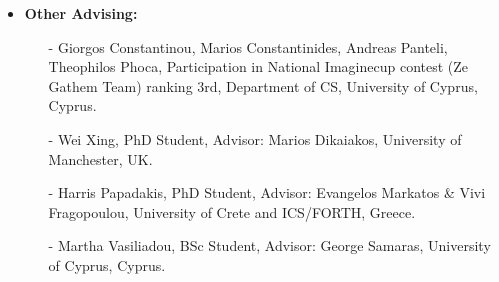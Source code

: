 \documentclass[10pt]{article}
\begin{document}
\begin{itemize}
   \item {\bf Other Advising: }
	\begin{itemize}
		\setlength{\itemsep}{0.10ex}
			\item[-] Giorgos Constantinou, Marios Constantinides, Andreas Panteli, Theophilos Phoca, Participation in National Imaginecup contest (Ze Gathem Team) ranking 3rd, Department of CS, University of Cyprus, Cyprus.
			\item[-] Wei Xing, PhD Student, Advisor: Marios Dikaiakos, University of Manchester, UK.
			\item[-] Harris Papadakis, PhD Student, Advisor: Evangelos Markatos \& Vivi Fragopoulou, University of Crete and ICS/FORTH, Greece.
			\item[-] Martha Vasiliadou, BSc Student, Advisor: George Samaras, University of Cyprus, Cyprus.
	\end{itemize}   		
\end{itemize}
\end{document}
